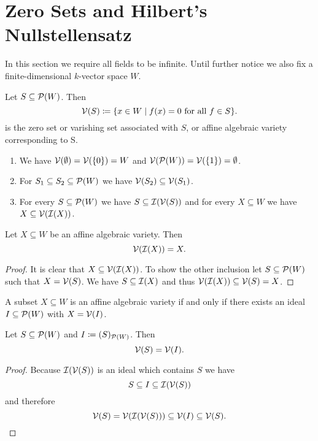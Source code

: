 \section{Zero Sets and Hilbert’s Nullstellensatz}
In this section we require all fields to be infinite. Until further notice we also fix a finite-dimensional $k$-vector space $W$.


\begin{defi}
 Let $S \subseteq \mathcal{P}(W)$. Then
 \[
  \mathcal{V}(S) \coloneqq \{x \in W \mid f(x) = 0 \text{ for all } f \in S\}.
 \]
 is the zero set or varishing set associated with $S$, or affine algebraic variety corresponding to S.
\end{defi}


\begin{expls}
 \begin{enumerate}[label=\emph{\alph*)},leftmargin=*]
  \item
   We have $\mathcal{V}(\emptyset) = \mathcal{V}(\{0\}) = W$ and $\mathcal{V}(\mathcal{P}(W)) = \mathcal{V}(\{1\}) = \emptyset$.
  \item
   For $S_1 \subseteq S_2 \subseteq \mathcal{P}(W)$ we have $\mathcal{V}(S_2) \subseteq \mathcal{V}(S_1)$.
  \item
   For every $S \subseteq \mathcal{P}(W)$ we have $S \subseteq \mathcal{I}(\mathcal{V}(S))$ and for every $X \subseteq W$ we have $X \subseteq \mathcal{V}(\mathcal{I}(X))$.
 \end{enumerate}
\end{expls}


\begin{lem}
 Let $X \subseteq W$ be an affine algebraic variety. Then
 \[
  \mathcal{V}(\mathcal{I}(X)) = X.
 \]
\end{lem}
\begin{proof}
 It is clear that $X \subseteq \mathcal{V}(\mathcal{I}(X))$. To show the other inclusion let $S \subseteq \mathcal{P}(W)$ such that $X = \mathcal{V}(S)$. We have $S \subseteq \mathcal{I}(X)$ and thus $\mathcal{V}(\mathcal{I}(X)) \subseteq \mathcal{V}(S) = X$.
\end{proof}


\begin{cor}
 A subset $X \subseteq W$ is an affine algebraic variety if and only if there exists an ideal $I \subseteq \mathcal{P}(W)$ with $X = \mathcal{V}(I)$.
\end{cor}



\begin{cor}
 Let $S \subseteq \mathcal{P}(W)$ and $I \coloneqq (S)_{\mathcal{P}(W)}$. Then
 \[
  \mathcal{V}(S) = \mathcal{V}(I).
 \]
\end{cor}
\begin{proof}
 Because $\mathcal{I}(\mathcal{V}(S))$ is an ideal which contains $S$ we have
 \[
  S \subseteq I \subseteq \mathcal{I}(\mathcal{V}(S))
 \]
 and therefore
 \[
  \mathcal{V}(S) = \mathcal{V}(\mathcal{I}(\mathcal{V}(S))) \subseteq \mathcal{V}(I) \subseteq \mathcal{V}(S).
  \qedhere
 \]
\end{proof}


